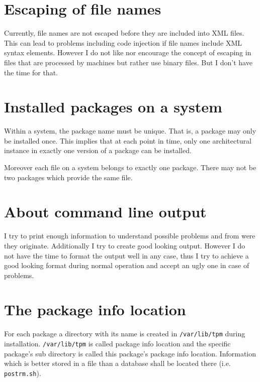 \documentclass[a4paper]{article}
\newcommand{\file}[1]{\texttt{#1}}
\begin{document}
	\section{Escaping of file names}
	\label{sec:escaping_of_file_names}
	
	Currently, file names are not escaped before they are included into XML files. This can lead to problems including code injection if file names include XML syntax elements. However I do not like nor encourage the concept of escaping in files that are processed by machines but rather use binary files. But I don't have the time for that.
	
	\section{Installed packages on a system}
	\label{sec:installed_packages_on_a_system}
	
	Within a system, the package name must be unique. That is, a package may only be installed once. This implies that at each point in time, only one architectural instance in exactly one version of a package can be installed.
	
	Moreover each file on a system belongs to exactly one package. There may not be two packages which provide the same file.
	
	\section{About command line output}
	\label{sec:about_command_line_output}
	
	I try to print enough information to understand possible problems and from were they originate. Additionally I try to create good looking output. However I do not have the time to format the output well in any case, thus I try to achieve a good looking format during normal operation and accept an ugly one in case of problems.
	
	\section{The package info location}
	\label{sec:the_package_info_location}
	
	For each package a directory with its name is created in \file{/var/lib/tpm} during installation. \file{/var/lib/tpm} is called package info location and the specific package's sub directory is called this package's package info location. Information which is better stored in a file than a database shall be located there (i.e. \file{postrm.sh}).
	
\end{document}
